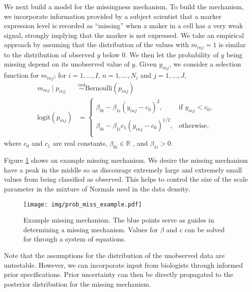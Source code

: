 \documentclass[12pt,]{article}
\newcommand{\p}[1]{\left(#1\right)}
\def\beginmyfig{\begin{figure}[H]\center}
\def\endmyfig{\end{figure}}
\newcommand{\ind}{\overset{ind}{\sim}}
\def\logit{\text{logit}}
\def\Bern{\text{Bernoulli}}
\def\Prob{\text{Pr}}
\def\beginmyfig{\begin{figure}[H]\center}
\def\endmyfig{\end{figure}}
\begin{document}
We next build a model for the missingness mechanism.
To build the mechanism, we incorporate information provided by a subject
scientist that a marker expression level is recorded as ``missing'' when a
maker in a cell has a very weak signal, strongly implying that the marker is
not expressed.
We take an empirical approach by assuming that the distribution of the values
with $m_{inj}=1$ is similar to the distribution of observed $y$ below 0. We
then let the probability of $y$ being missing depend on its unobserved value of
$y$.
%
Given
\(y_{inj}\), we consider a selection function for \(m_{inj}\); for
\(i=1, \ldots, I\), \(n=1, \ldots, N_i\) and \(j=1, \ldots, J\),
\begin{align}
  m_{inj} \mid p_{inj} &\ind \Bern(p_{inj}) \nonumber \\
  \logit(p_{inj}) &= \begin{cases}
  \beta_{0i} - \beta_{1i}(y_{inj}-c_0)^2, & \text{if } y_{inj} < c_0\nonumber, \\
  \beta_{0i} - \beta_{1i}c_1\p{y_{inj}-c_0}^{1/2}, & \text{otherwise}, \nonumber \\
  \end{cases} \label{eq:missing}
\end{align}
where \(c_0\) and \(c_1\) are real constants, $\beta_{0i} \in \mathbb{R}$ , and
$\beta_{1i} > 0$.

Figure \ref{fig:prob-miss-eg} shows an example missing mechanism. We desire the
missing mechanism have a peak in the middle so as discourage extremely large
and extremely small values from being classified as observed. This helps to
control the size of the scale parameter in the mixture of Normals used in the
data density.
\beginmyfig
\texttt{[image: img/prob\_miss\_example.pdf]}
\caption{Example missing mechanism. The blue points serve as guides in
determining a missing mechanism. Values for $\beta$ and $c$ can be solved for
through a system of equations.}
\label{fig:prob-miss-eg}
\endmyfig

Note that the assumptions for the distribution of the unobserved data are
untestable. However, we can incorporate input from biologists through informed
prior specifications. Prior uncertainty can then be directly propagated to the
posterior distribution for the missing mechanism.
\end{document}
